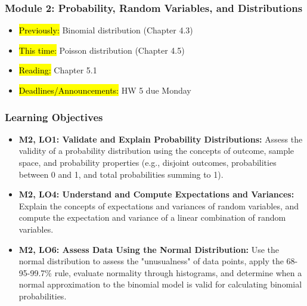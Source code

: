 
\begin{frame}
    \frametitle{Module 2: Probability, Random Variables, and Distributions}
    \begin{itemize}
        \item \hl{Previously: }Binomial distribution (Chapter 4.3)
        \item \hl{This time: }Poisson distribution (Chapter 4.5)
        \item \hl{Reading: }Chapter 5.1
        \item \hl{Deadlines/Announcements: } HW 5 due Monday
    \end{itemize}

\end{frame}

\begin{frame}
    \frametitle{Learning Objectives}
    \begin{itemize}
        \item \textbf{M2, LO1: Validate and Explain Probability Distributions:} Assess the validity of a probability distribution using the concepts of outcome, sample space, and probability properties (e.g., disjoint outcomes, probabilities between 0 and 1, and total probabilities summing to 1).
        \item \textbf{M2, LO4: Understand and Compute Expectations and Variances:} Explain the concepts of expectations and variances of random variables, and compute the expectation and variance of a linear combination of random variables.
        \item \textbf{M2, LO6: Assess Data Using the Normal Distribution:} Use the normal distribution to assess the "unusualness" of data points, apply the 68-95-99.7\% rule, evaluate normality through histograms, and determine when a normal approximation to the binomial model is valid for calculating binomial probabilities.
    \end{itemize}
\end{frame}
